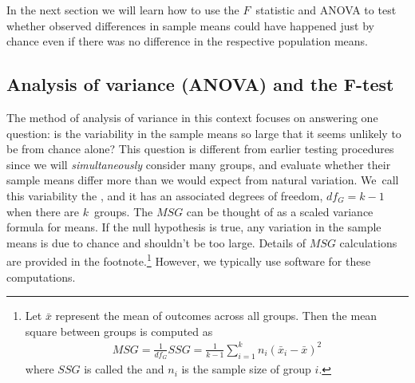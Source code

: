In the next section we will learn how to use the $F$~statistic
and ANOVA to test whether observed differences in sample means
could have happened just by chance even if there was no
difference in the respective population means.


\D{\newpage}

\subsection{Analysis of variance (ANOVA)
    and the $\pmb{F}$-test}

The method of analysis of variance in this context focuses
on answering one question:
is the variability in the sample means so large that it seems
unlikely to be from chance alone?
This question is different from earlier testing procedures
since we will \emph{simultaneously} consider many groups,
and evaluate whether their sample means differ more than
we would expect from natural variation.
We~call this variability the
,
and it has an associated degrees of freedom,
$df_{G} = k - 1$ when there are
$k$~groups.
The $MSG$ can be thought of as a scaled variance formula
for means.
If the null hypothesis is true, any variation in the sample
means is due to chance and shouldn't be too large.
Details of $MSG$ calculations are provided in the
footnote.\footnote{Let $\bar{x}$ represent the mean of
  outcomes across all groups.
  Then the mean square between groups is computed as
  \begin{align*}
  MSG
    = \frac{1}{df_{G}}SSG
    = \frac{1}{k-1}\sum_{i=1}^{k} n_{i}
        \left(\bar{x}_{i} - \bar{x}\right)^2
  \end{align*}
  where $SSG$ is called the 
  and $n_{i}$ is the sample size of group $i$.}
However, we typically use software for these computations.

